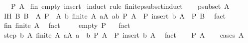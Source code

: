 \begin{isabellebody}
\ \ \ {\isachardoublequoteopen}P\ A{\isachardoublequoteclose}\isanewline
%
\isadelimproof
%
\endisadelimproof
%
\isatagproof
{}\isamarkupfalse%
\ fin\ empty\ insert\isanewline
{}\isamarkupfalse%
\ {\isacharparenleft}{\kern0pt}induct\ rule{\isacharcolon}{\kern0pt}\ finite{\isacharunderscore}{\kern0pt}psubset{\isacharunderscore}{\kern0pt}induct{\isacharparenright}{\kern0pt}\isanewline
\ \ \isamarkupfalse%
\ {\isacharparenleft}{\kern0pt}psubset\ A{\isacharparenright}{\kern0pt}\isanewline
\ \ \isamarkupfalse%
\ IH{\isacharcolon}{\kern0pt}\ {\isachardoublequoteopen}{\isasymAnd}B{\isachardot}{\kern0pt}\ {\isasymlbrakk}B\ {\isacharless}{\kern0pt}\ A{\isacharsemicolon}{\kern0pt}\ P\ {\isacharbraceleft}{\kern0pt}{\isacharbraceright}{\kern0pt}{\isacharsemicolon}{\kern0pt}\ {\isacharparenleft}{\kern0pt}{\isasymAnd}A\ b{\isachardot}{\kern0pt}\ {\isasymlbrakk}finite\ A{\isacharsemicolon}{\kern0pt}\ {\isasymforall}a{\isasymin}A{\isachardot}{\kern0pt}\ a{\isacharless}{\kern0pt}b{\isacharsemicolon}{\kern0pt}\ P\ A{\isasymrbrakk}\ {\isasymLongrightarrow}\ P\ {\isacharparenleft}{\kern0pt}insert\ b\ A{\isacharparenright}{\kern0pt}{\isacharparenright}{\kern0pt}{\isasymrbrakk}\ {\isasymLongrightarrow}\ P\ B{\isachardoublequoteclose}\ \isamarkupfalse%
\ fact\ \isanewline
\ \ \isamarkupfalse%
\ fin{\isacharcolon}{\kern0pt}\ {\isachardoublequoteopen}finite\ A{\isachardoublequoteclose}\ \isamarkupfalse%
\ fact\ \isanewline
\ \ \isamarkupfalse%
\ empty{\isacharcolon}{\kern0pt}\ {\isachardoublequoteopen}P\ {\isacharbraceleft}{\kern0pt}{\isacharbraceright}{\kern0pt}{\isachardoublequoteclose}\ \isamarkupfalse%
\ fact\isanewline
\ \ \isamarkupfalse%
\ step{\isacharcolon}{\kern0pt}\ {\isachardoublequoteopen}{\isasymAnd}b\ A{\isachardot}{\kern0pt}\ {\isasymlbrakk}finite\ A{\isacharsemicolon}{\kern0pt}\ {\isasymforall}a{\isasymin}A{\isachardot}{\kern0pt}\ a\ {\isacharless}{\kern0pt}\ b{\isacharsemicolon}{\kern0pt}\ P\ A{\isasymrbrakk}\ {\isasymLongrightarrow}\ P\ {\isacharparenleft}{\kern0pt}insert\ b\ A{\isacharparenright}{\kern0pt}{\isachardoublequoteclose}\ \isamarkupfalse%
\ fact\isanewline
\ \ \isamarkupfalse%
\ {\isachardoublequoteopen}P\ A{\isachardoublequoteclose}\isanewline
\ \ \isamarkupfalse%
\ {\isacharparenleft}{\kern0pt}cases\ {\isachardoublequoteopen}A\ {\isacharequal}{\kern0pt}\ {\isacharbraceleft}{\kern0pt}{\isacharbraceright}{\kern0pt}{\isachardoublequoteclose}{\isacharparenright}{\kern0pt}\isanewline

\end{isabellebody}
